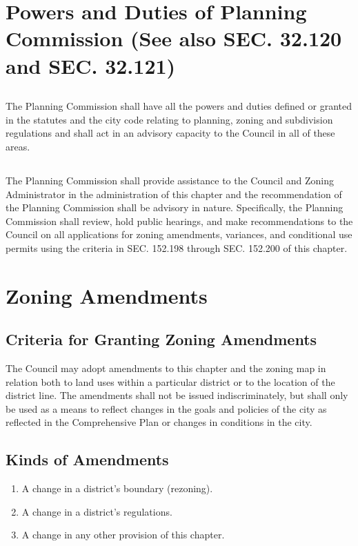 \section{Powers and Duties of Planning Commission (See also SEC. 32.120 and SEC. 32.121)}
\subsection{}
The Planning Commission shall have all the powers and duties defined or granted in the statutes and the city code relating to planning, zoning and subdivision regulations and shall act in an advisory capacity to the Council in all of these areas.
\subsection{}
The Planning Commission shall provide assistance to the Council and Zoning Administrator in the administration of this chapter and the recommendation of the Planning Commission shall be advisory in nature. Specifically, the Planning Commission shall review, hold public hearings, and make recommendations to the Council on all applications for zoning amendments, variances, and conditional use permits using the criteria in SEC. 152.198 through SEC. 152.200 of this chapter.

\section{Zoning Amendments}
\subsection{Criteria for Granting Zoning Amendments}
The Council may adopt amendments to this chapter and the zoning map in relation both to land uses within a particular district or to the location of the district line. The amendments shall not be issued indiscriminately, but shall only be used as a means to reflect changes in the goals and policies of the city as reflected in the Comprehensive Plan or changes in conditions in the city.
\subsection{Kinds of Amendments}
\begin{enumerate}[{\indent}1)]
    \item A change in a district’s boundary (rezoning).
    \item A change in a district’s regulations.
    \item A change in any other provision of this chapter.
\end{enumerate}
